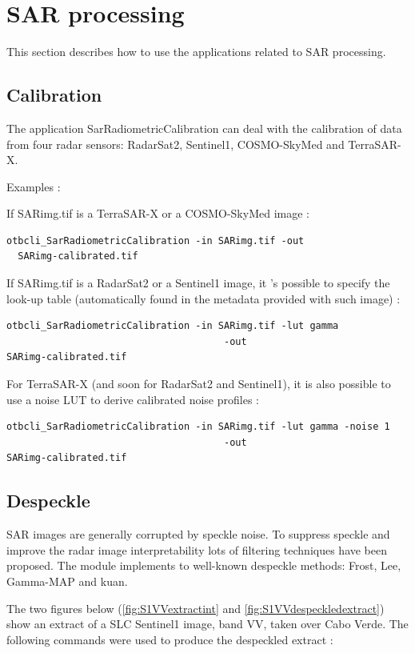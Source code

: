 \newpage
\section{SAR processing}

This section describes how to use the applications related to SAR processing.

\subsection{Calibration}

The application SarRadiometricCalibration can deal with the calibration of data from four radar sensors:
RadarSat2, Sentinel1, COSMO-SkyMed and TerraSAR-X.

Examples :

If SARimg.tif is a TerraSAR-X or a COSMO-SkyMed image :

\begin{verbatim} 
otbcli_SarRadiometricCalibration -in SARimg.tif -out
  SARimg-calibrated.tif 
\end{verbatim}
									  
If SARimg.tif is a RadarSat2 or a Sentinel1 image, it 's possible to specify the look-up table 
(automatically found in the metadata provided with such image) :

\begin{verbatim} 
otbcli_SarRadiometricCalibration -in SARimg.tif -lut gamma
									  -out
SARimg-calibrated.tif 
\end{verbatim}

For TerraSAR-X (and soon for RadarSat2 and Sentinel1), it is also possible
to use a noise LUT to derive calibrated noise profiles :

\begin{verbatim} 
otbcli_SarRadiometricCalibration -in SARimg.tif -lut gamma -noise 1
									  -out
SARimg-calibrated.tif 
\end{verbatim}

\subsection{Despeckle}
SAR images are generally corrupted by speckle noise. To suppress 
speckle and improve the radar image interpretability lots of filtering 
techniques have been proposed.  The module implements to well-known 
despeckle methods: Frost, Lee, Gamma-MAP and kuan.

The two figures below (\ref{fig:S1VVextractint} and \ref{fig:S1VVdespeckledextract}) show an extract of a SLC Sentinel1 image, band VV, taken over Cabo Verde.
The following commands were used to produce the despeckled extract :


